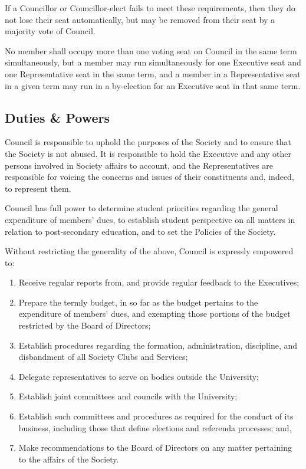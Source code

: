 If a Councillor or Councillor-elect fails to meet these requirements, then they
do not lose their seat automatically, but may be removed from their seat by a
majority vote of Council.

No member shall occupy more than one voting seat on Council in the same term
simultaneously, but a member may run simultaneously for one Executive seat and
one Representative seat in the same term, and a member in a Representative seat
in a given term may run in a by-election for an Executive seat in that same
term.

\subsection{Duties \& Powers}
Council is responsible to uphold the purposes of the Society and to
ensure that the Society is not abused. It is responsible to hold the Executive
and any other persons involved in Society affairs to account, and the
Representatives are responsible for voicing the concerns and issues of their
constituents and, indeed, to represent them. 

Council has full power to determine student priorities regarding the
general expenditure of members’ dues, to establish student perspective on all
matters in relation to post-secondary education, and to set the Policies of the
Society.

Without restricting the generality of the above, Council is expressly
empowered to:
\begin{enumerate}
    \item Receive regular reports from, and provide regular feedback to the
        Executives;
    \item Prepare the termly budget, in so far as the budget pertains to the 
        expenditure of members’ dues, and
        exempting those portions of the budget restricted by the Board of 
        Directors;
    \item Establish procedures regarding the formation, administration,
        discipline, and disbandment of all Society Clubs and Services;
    \item Delegate representatives to serve on bodies outside the University;
    \item Establish joint committees and councils with the University;
    \item Establish such committees and procedures as required for the conduct
        of its business, including those that define elections and referenda
        processes; and,
    \item Make recommendations to the Board of Directors on any matter
        pertaining to the affairs of the Society.
\end{enumerate}

